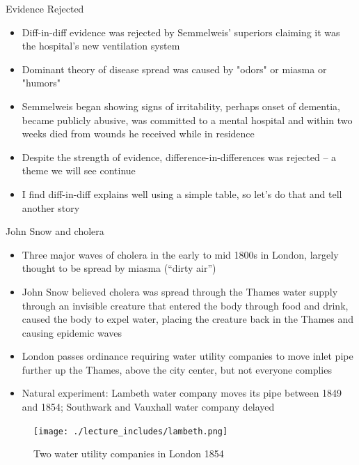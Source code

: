 \documentclass{beamer}
\begin{document}
\begin{frame}{Evidence Rejected}

\begin{itemize}

\item Diff-in-diff evidence was rejected by Semmelweis' superiors claiming it was the hospital's new ventilation system
\item Dominant theory of disease spread was caused by "odors" or miasma or "humors"
\item Semmelweis began showing signs of irritability, perhaps onset of dementia, became publicly abusive, was committed to a mental hospital and within two weeks died from wounds he received while in residence
\item Despite the strength of evidence, difference-in-differences was rejected -- a theme we will see continue
\item I find diff-in-diff explains well using a simple table, so let's do that and tell another story

\end{itemize}

\end{frame}






\begin{frame}{John Snow and cholera}

\begin{itemize}
\item Three major waves of cholera in the early to mid 1800s in London, largely thought to be spread by miasma (``dirty air'')
\item John Snow believed cholera was spread through the Thames water supply through an invisible creature that entered the body through food and drink, caused the body to expel water, placing the creature back in the Thames and causing epidemic waves
\item London passes ordinance requiring water utility companies to move inlet pipe further up the Thames, above the city center, but not everyone complies
\item Natural experiment: Lambeth water company moves its pipe between 1849 and 1854; Southwark and Vauxhall water company delayed
\end{itemize}

\end{frame}


\begin{frame}

	\begin{figure}
	\caption{Two water utility companies in London 1854}
	\texttt{[image: ./lecture\_includes/lambeth.png]}
	\end{figure}


\end{frame}
\end{document}

